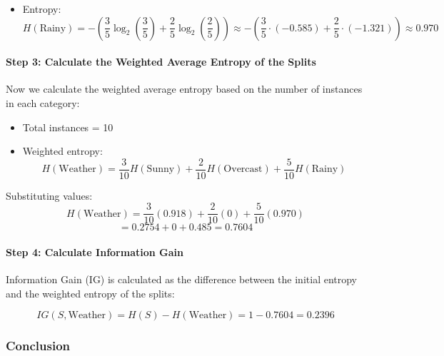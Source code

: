 \documentclass[12pt]{book}
\providecommand{\tightlist}{%
  \setlength{\itemsep}{0pt}\setlength{\parskip}{0pt}}
\begin{document}
\begin{enumerate}
\begin{itemize}
    \begin{itemize}
    \tightlist
    \item
      \(( p_{\text{Yes}} = \frac{3}{5} )\)
    \item
      \(( p_{\text{No}} = \frac{2}{5} )\)
    \end{itemize}
  \item
    Entropy: \[
    H(\text{Rainy}) = -\left(\frac{3}{5} \log_2\left(\frac{3}{5}\right) + \frac{2}{5} \log_2\left(\frac{2}{5}\right)\right) \approx -\left(\frac{3}{5} \cdot (-0.585) + \frac{2}{5} \cdot (-1.321)\right) \approx 0.970
    \]
  \end{itemize}
\end{enumerate}

\paragraph{Step 3: Calculate the Weighted Average Entropy of the
Splits}\label{step-3-calculate-the-weighted-average-entropy-of-the-splits}

Now we calculate the weighted average entropy based on the number of
instances in each category:

\begin{itemize}
\tightlist
\item
  Total instances = 10
\item
  Weighted entropy: \[
  H(\text{Weather}) = \frac{3}{10} H(\text{Sunny}) + \frac{2}{10} H(\text{Overcast}) + \frac{5}{10} H(\text{Rainy})
  \]
\end{itemize}

Substituting values: \[
H(\text{Weather}) = \frac{3}{10}(0.918) + \frac{2}{10}(0) + \frac{5}{10}(0.970)
\] \[
= 0.2754 + 0 + 0.485 = 0.7604
\]

\paragraph{Step 4: Calculate Information
Gain}\label{step-4-calculate-information-gain}

Information Gain (IG) is calculated as the difference between the
initial entropy and the weighted entropy of the splits:

\[
IG(S, \text{Weather}) = H(S) - H(\text{Weather}) = 1 - 0.7604 = 0.2396
\]

\subsubsection{Conclusion}\label{conclusion}
\end{document}
